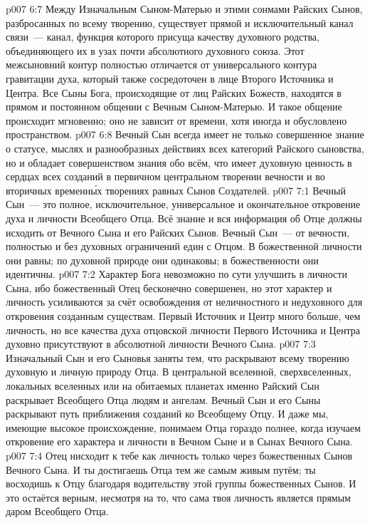 \vs p007 6:7 \pc Между Изначальным Сыном\hyp{}Матерью и этими сонмами Райских Сынов, разбросанных по всему творению, существует прямой и исключительный канал связи~--- канал, функция которого присуща качеству духовного родства, объединяющего их в узах почти абсолютного духовного союза. Этот межсыновний контур полностью отличается от универсального контура гравитации духа, который также сосредоточен в лице Второго Источника и Центра. Все Сыны Бога, происходящие от лиц Райских Божеств, находятся в прямом и постоянном общении с Вечным Сыном\hyp{}Матерью. И такое общение происходит мгновенно; оно не зависит от времени, хотя иногда и обусловлено пространством.
\vs p007 6:8 Вечный Сын всегда имеет не только совершенное знание о статусе, мыслях и разнообразных действиях всех категорий Райского сыновства, но и обладает совершенством знания обо всём, что имеет духовную ценность в сердцах всех созданий в первичном центральном творении вечности и во вторичных временн\'ых творениях равных Сынов Создателей.
\vs p007 7:1 Вечный Сын~--- это полное, исключительное, универсальное и окончательное откровение духа и личности Всеобщего Отца. Всё знание и вся информация об Отце должны исходить от Вечного Сына и его Райских Сынов. Вечный Сын~--- от вечности, полностью и без духовных ограничений един с Отцом. В божественной личности они равны; по духовной природе они одинаковы; в божественности они идентичны.
\vs p007 7:2 Характер Бога невозможно по сути улучшить в личности Сына, ибо божественный Отец бесконечно совершенен, но этот характер и личность усиливаются за счёт освобождения от неличностного и недуховного для откровения созданным существам. Первый Источник и Центр много больше, чем личность, но все качества духа отцовской личности Первого Источника и Центра духовно присутствуют в абсолютной личности Вечного Сына.
\vs p007 7:3 Изначальный Сын и его Сыновья заняты тем, что раскрывают всему творению духовную и личную природу Отца. В центральной вселенной, сверхвселенных, локальных вселенных или на обитаемых планетах именно Райский Сын раскрывает Всеобщего Отца людям и ангелам. Вечный Сын и его Сыны раскрывают путь приближения созданий ко Всеобщему Отцу. И даже мы, имеющие высокое происхождение, понимаем Отца гораздо полнее, когда изучаем откровение его характера и личности в Вечном Сыне и в Сынах Вечного Сына.
\vs p007 7:4 Отец нисходит к тебе как личность только через божественных Сынов Вечного Сына. И ты достигаешь Отца тем же самым живым путём; ты восходишь к Отцу благодаря водительству этой группы божественных Сынов. И это остаётся верным, несмотря на то, что сама твоя личность является прямым даром Всеобщего Отца.
